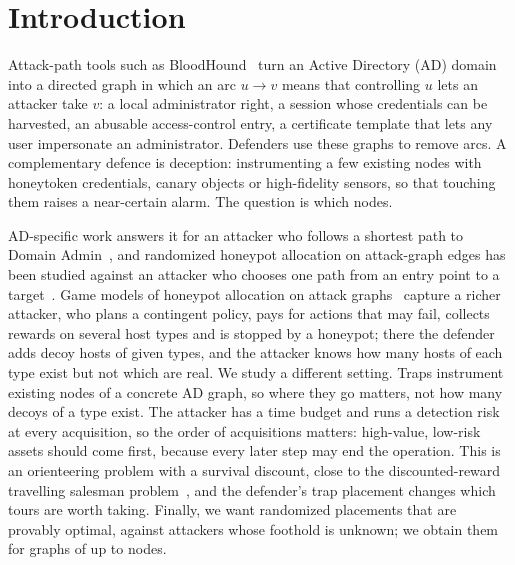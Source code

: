 \documentclass[runningheads]{llncs}
\begin{document}
\section{Introduction}

Attack-path tools such as BloodHound~\cite{bloodhound} turn an Active Directory (AD) domain into a directed graph in which an arc $u\to v$ means that controlling $u$ lets an attacker take $v$: a local administrator right, a session whose credentials can be harvested, an abusable access-control entry, a certificate template that lets any user impersonate an administrator. Defenders use these graphs to remove arcs. A complementary defence is deception: instrumenting a few existing nodes with honeytoken credentials, canary objects or high-fidelity sensors, so that touching them raises a near-certain alarm. The question is which nodes.

AD-specific work answers it for an attacker who follows a shortest path to Domain Admin~\cite{ngo2024catch,ngo2023near}, and randomized honeypot allocation on attack-graph edges has been studied against an attacker who chooses one path from an entry point to a target~\cite{sayed2023zeroday,sayed2023tactical}. Game models of honeypot allocation on attack graphs~\cite{durkota2015optimal,durkota2015approximate} capture a richer attacker, who plans a contingent policy, pays for actions that may fail, collects rewards on several host types and is stopped by a honeypot; there the defender adds decoy hosts of given types, and the attacker knows how many hosts of each type exist but not which are real. We study a different setting. Traps instrument existing nodes of a concrete AD graph, so where they go matters, not how many decoys of a type exist. The attacker has a time budget and runs a detection risk at every acquisition, so the order of acquisitions matters: high-value, low-risk assets should come first, because every later step may end the operation. This is an orienteering problem with a survival discount, close to the discounted-reward travelling salesman problem~\cite{blum2007orienteering}, and the defender's trap placement changes which tours are worth taking. Finally, we want randomized placements that are provably optimal, against attackers whose foothold is unknown; we obtain them for graphs of up to \NodesMaxCert{} nodes.
\end{document}
